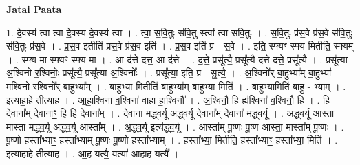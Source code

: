 \documentclass[17pt]{extarticle}
\begin{document}
\textbf{Jatai Paata} \newline

1. दे॒वस्य॑ त्वा त्वा दे॒वस्य॑ दे॒वस्य॑ त्वा । . त्वा॒ स॒वि॒तुः स॑वि॒तु स्त्वा᳚ त्वा सवि॒तुः । . स॒वि॒तुः प्र॑स॒वे प्र॑स॒वे स॑वि॒तुः स॑वि॒तुः प्र॑स॒वे । . प्र॒स॒व इतीति॑ प्रस॒वे प्र॑स॒व इति॑ । . प्र॒स॒व इति॑ प्र - स॒वे । . इति॒ स्फ्यꣳ स्फ्य मितीति॒ स्फ्यम् । . स्फ्य मा स्फ्यꣳ स्फ्य मा । . आ द॑त्ते दत्त॒ आ द॑त्ते । . द॒त्ते॒ प्रसू᳚त्यै॒ प्रसू᳚त्यै दत्ते दत्ते॒ प्रसू᳚त्यै । . प्रसू᳚त्या अ॒श्विनो॑ र॒श्विनोः॒ प्रसू᳚त्यै॒ प्रसू᳚त्या अ॒श्विनोः᳚ । . प्रसू᳚त्या॒ इति॒ प्र - सू॒त्यै॒ । . अ॒श्विनो᳚र् बा॒हुभ्या᳚म् बा॒हुभ्या॑ म॒श्विनो॑ र॒श्विनो᳚र् बा॒हुभ्या᳚म् । . बा॒हुभ्या॒ मितीति॑ बा॒हुभ्या᳚म् बा॒हुभ्या॒ मिति॑ । . बा॒हुभ्या॒मिति॑ बा॒हु - भ्या॒म् । . इत्या॑हा॒हे तीत्या॑ह । . आ॒हा॒श्विना॑ व॒श्विना॑ वाहा हा॒श्विनौ᳚ । . अ॒श्विनौ॒ हि ह्य॑श्विना॑ व॒श्विनौ॒ हि । . हि दे॒वाना᳚म् दे॒वानाꣳ॒॒ हि हि दे॒वाना᳚म् । . दे॒वाना॑ मद्ध्व॒र्यू अ॑द्ध्व॒र्यू दे॒वाना᳚म् दे॒वाना॑ मद्ध्व॒र्यू । . अ॒द्ध्व॒र्यू आस्ता॒ मास्ता॑ मद्ध्व॒र्यू अ॑द्ध्व॒र्यू आस्ता᳚म् । . अ॒द्ध्व॒र्यू इत्य॑द्ध्व॒र्यू । . आस्ता᳚म् पू॒ष्णः पू॒ष्ण आस्ता॒ मास्ता᳚म् पू॒ष्णः । . पू॒ष्णो हस्ता᳚भ्याꣳ॒॒ हस्ता᳚भ्याम् पू॒ष्णः पू॒ष्णो हस्ता᳚भ्याम् । . हस्ता᳚भ्या॒ मितीति॒ हस्ता᳚भ्याꣳ॒॒ हस्ता᳚भ्या॒ मिति॑ । . इत्या॑हा॒हे तीत्या॑ह । . आ॒ह॒ यत्यै॒ यत्या॑ आहाह॒ यत्यै᳚ । \newline
\end{document}

